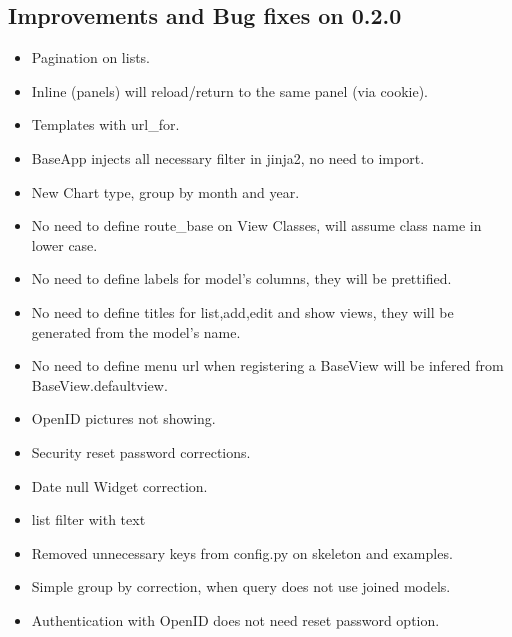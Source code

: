 \documentclass[letterpaper,10pt,english]{sphinxmanual}
\begin{document}
\subsection{Improvements and Bug fixes on 0.2.0}
\label{versions:improvements-and-bug-fixes-on-0-2-0}\begin{itemize}
\item {} 
Pagination on lists.

\item {} 
Inline (panels) will reload/return to the same panel (via cookie).

\item {} 
Templates with url\_for.

\item {} 
BaseApp injects all necessary filter in jinja2, no need to import.

\item {} 
New Chart type, group by month and year.

\item {} 
No need to define route\_base on View Classes, will assume class name in lower case.

\item {} 
No need to define labels for model's columns, they will be prettified.

\item {} 
No need to define titles for list,add,edit and show views, they will be generated from the model's name.

\item {} 
No need to define menu url when registering a BaseView will be infered from BaseView.defaultview.

\item {} 
OpenID pictures not showing.

\item {} 
Security reset password corrections.

\item {} 
Date null Widget correction.

\item {} 
list filter with text

\item {} 
Removed unnecessary keys from config.py on skeleton and examples.

\item {} 
Simple group by correction, when query does not use joined models.

\item {} 
Authentication with OpenID does not need reset password option.

\end{itemize}
\end{document}
